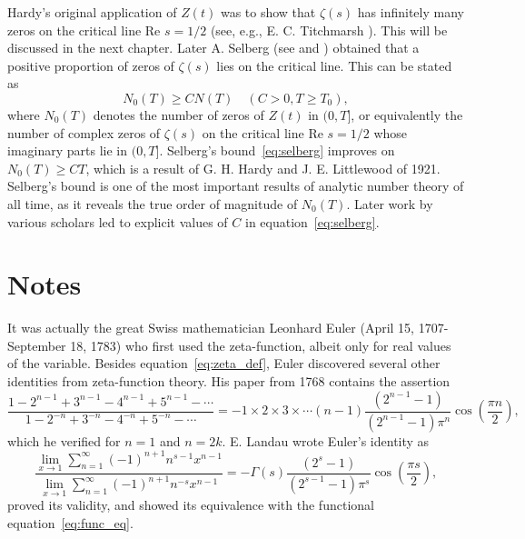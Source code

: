 \documentclass[11pt]{article}
\begin{document}
Hardy's original application of $Z(t)$ was to show that $\zeta(s)$ has infinitely many zeros on the critical line $\text{Re } s = 1/2$ (see, e.g., E. C. Titchmarsh \cite{Tit3}). This will be discussed in the next chapter. Later A. Selberg (see \cite{Sel} and \cite{Tit3}) obtained that a positive proportion of zeros of $\zeta(s)$ lies on the critical line. This can be stated as
\begin{equation}\label{eq:selberg}
N_0(T) \geq C N(T) \quad (C > 0, T \geq T_0),
\end{equation}
where $N_0(T)$ denotes the number of zeros of $Z(t)$ in $(0, T]$, or equivalently the number of complex zeros of $\zeta(s)$ on the critical line $\text{Re } s = 1/2$ whose imaginary parts lie in $(0, T]$. Selberg's bound~\eqref{eq:selberg} improves on $N_0(T) \geq CT$, which is a result of G. H. Hardy and J. E. Littlewood \cite{HaLi2} of 1921. Selberg's bound is one of the most important results of analytic number theory of all time, as it reveals the true order of magnitude of $N_0(T)$. Later work by various scholars led to explicit values of $C$ in equation~\eqref{eq:selberg}.

\section*{Notes}

It was actually the great Swiss mathematician Leonhard Euler (April 15, 1707-September 18, 1783) who first used the zeta-function, albeit only for real values of the variable. Besides equation~\eqref{eq:zeta_def}, Euler discovered several other identities from zeta-function theory. His paper \cite{Eul} from 1768 contains the assertion
\begin{equation}\label{eq:euler_identity}
\frac{1 - 2^{n-1} + 3^{n-1} - 4^{n-1} + 5^{n-1} - \cdots}{1 - 2^{-n} + 3^{-n} - 4^{-n} + 5^{-n} - \cdots} = -1 \times 2 \times 3 \times \cdots (n-1) \frac{(2^{n-1} - 1)}{(2^{n-1} - 1)\pi^n} \cos\left(\frac{\pi n}{2}\right),
\end{equation}
which he verified for $n = 1$ and $n = 2k$. E. Landau \cite{Lan} wrote Euler's identity as
\begin{equation}\label{eq:landau_euler}
\frac{\lim_{x \to 1} \sum_{n=1}^{\infty} (-1)^{n+1} n^{s-1} x^{n-1}}{\lim_{x \to 1} \sum_{n=1}^{\infty} (-1)^{n+1} n^{-s} x^{n-1}} = -\Gamma(s) \frac{(2^s - 1)}{(2^{s-1} - 1)\pi^s} \cos\left(\frac{\pi s}{2}\right),
\end{equation}
proved its validity, and showed its equivalence with the functional equation~\eqref{eq:func_eq}.
\end{document}
